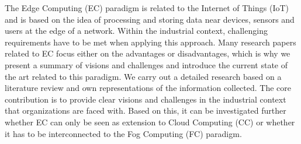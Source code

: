 The Edge Computing (EC) paradigm is related to the Internet of Things (IoT) and is based on the idea of processing and storing data near devices, sensors and users at the edge of a network. Within the industrial context, challenging requirements have to be met when applying this approach. Many research papers related to EC focus either on the advantages or disadvantages, which is why we present a summary of visions and challenges and introduce the current state of the art related to this paradigm. We carry out a detailed research based on a literature review and own representations of the information collected. The core contribution is to provide clear visions and challenges in the industrial context that organizations are faced with. Based on this, it can be investigated further whether EC can only be seen as extension to Cloud Computing (CC) or whether it has to be interconnected to the Fog Computing (FC) paradigm.
